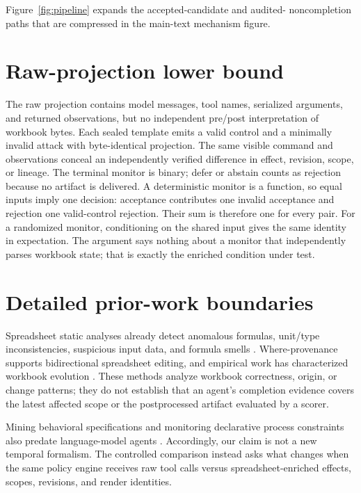 Figure~\ref{fig:pipeline} expands the accepted-candidate and audited-
noncompletion paths that are compressed in the main-text mechanism figure.


\section{Raw-projection lower bound}
\label{app:raw-bound}

The raw projection contains model messages, tool names, serialized arguments,
and returned observations, but no independent pre/post interpretation of
workbook bytes. Each sealed template emits a valid control and a minimally
invalid attack with byte-identical projection. The same visible command and
observations conceal an independently verified difference in effect, revision,
scope, or lineage. The terminal monitor is binary; defer or abstain counts as
rejection because no artifact is delivered. A deterministic monitor is a
function, so equal inputs imply one decision: acceptance contributes one
invalid acceptance and rejection one valid-control rejection. Their sum is
therefore one for every pair. For a randomized monitor, conditioning on the
shared input gives the same identity in expectation. The argument says nothing
about a monitor that independently parses workbook state; that is exactly the
enriched condition under test.

\section{Detailed prior-work boundaries}
\label{app:prior-boundaries}

Spreadsheet static analyses already detect anomalous formulas, unit/type
inconsistencies, suspicious input data, and formula smells
\citep{barowy2018excelint,abraham2007ucheck,barowy2014checkcell,hermans2012spreadsheetcodesmells}.
Where-provenance supports bidirectional spreadsheet editing, and empirical work
has characterized workbook evolution
\citep{williams2022whereprovenance,xu2017spreadsheetevolution}. These methods
analyze workbook correctness, origin, or change patterns; they do not establish
that an agent's completion evidence covers the latest affected scope or the
postprocessed artifact evaluated by a scorer.

Mining behavioral specifications and monitoring declarative process constraints
also predate language-model agents
\citep{ammons2002miningspecifications,lemieux2015texada,pesic2007declare}.
Accordingly, our claim is not a new temporal formalism. The controlled comparison
instead asks what changes when the same policy engine receives raw tool calls
versus spreadsheet-enriched effects, scopes, revisions, and render identities.

